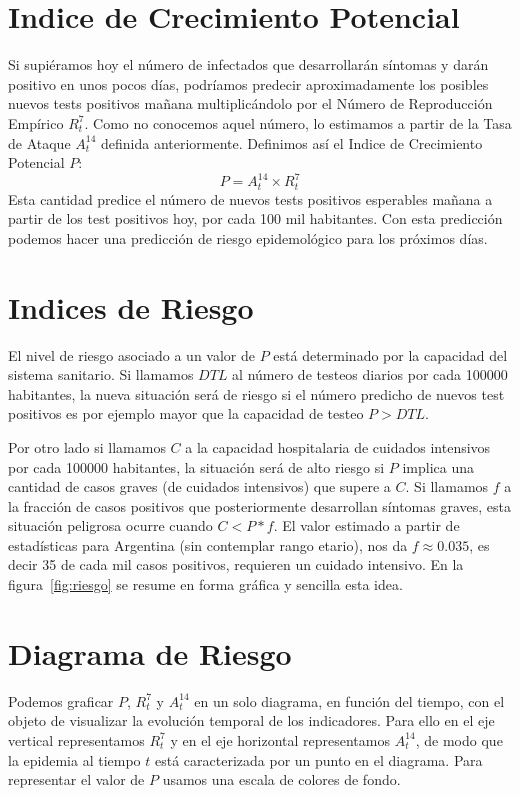 \documentclass[12pt,a4paper]{article}
\begin{document}
\section*{Indice de Crecimiento Potencial}

Si supiéramos hoy el número de infectados que desarrollarán síntomas 
y darán positivo en unos pocos días, podríamos predecir aproximadamente 
los posibles nuevos tests positivos mañana multiplicándolo por el Número de 
Reproducción Empírico $R^7_t$. Como no conocemos aquel número,
lo estimamos a partir de la Tasa de Ataque $A^{14}_t$ definida anteriormente.
Definimos así el Indice de Crecimiento Potencial $P$:
\begin{equation}
P = A^{14}_t \times R^7_t
\end{equation}
Esta cantidad predice el número de nuevos tests positivos 
esperables mañana a partir de los test positivos hoy, por cada 100 mil habitantes. 
Con esta predicción podemos hacer una predicción de 
riesgo epidemológico para los próximos días. 


\section*{Indices de Riesgo}

El nivel de riesgo asociado a un valor de $P$ está determinado por la capacidad 
del sistema sanitario. Si llamamos $DTL$ al número de testeos diarios por 
cada 100000 habitantes, la nueva situación será de riesgo si el número predicho 
de nuevos test positivos es por ejemplo mayor que la
capacidad de testeo $P > DTL$.

Por otro lado si llamamos $C$ a la capacidad hospitalaria de cuidados intensivos 
por cada 100000 habitantes, la situación será de alto riesgo si $P$ implica una 
cantidad de casos graves (de cuidados intensivos) que supere a $C$.
Si llamamos $f$ a la fracción de casos positivos que posteriormente 
desarrollan síntomas graves, esta situación peligrosa ocurre cuando 
$C < P * f$. El valor estimado a partir de estadísticas para Argentina 
(sin contemplar rango etario), nos da $f\approx 0.035$, es decir 35 de 
cada mil casos positivos, requieren un cuidado intensivo. 
En la figura~\ref{fig:riesgo} se resume en forma gráfica y sencilla esta idea.

\section*{Diagrama de Riesgo}

Podemos graficar $P$,  $R^7_t$ y $A^{14}_t$ en un solo diagrama, en función del tiempo, 
con el objeto de visualizar la evolución temporal de los indicadores. 
Para ello en el eje vertical representamos $R^7_t$ y en el eje horizontal 
representamos $A^{14}_t$, de modo que la epidemia al tiempo $t$ está caracterizada 
por un punto en el diagrama. Para representar el valor de 
$P$ usamos una escala de colores de fondo. 
\end{document}
